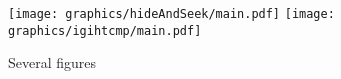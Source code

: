 \documentclass{article}
\begin{document}
    \thispagestyle{empty}%
    \begin{figure}[h]
        \centering
            {\texttt{[image: graphics/hideAndSeek/main.pdf]}}
            \hspace{0.5in}
            {\texttt{[image: graphics/igihtcmp/main.pdf]}} \\
        \caption{Several figures}
    \end{figure}
\end{document}
